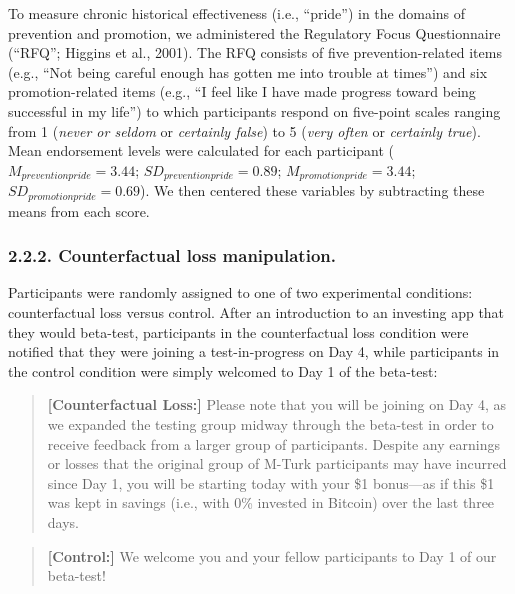 \documentclass[man,floatsintext]{apa6}
\begin{document}
To measure chronic historical effectiveness (i.e., \enquote{pride}) in the domains of prevention and promotion, we administered the Regulatory Focus Questionnaire (``RFQ''; Higgins et al., 2001). The RFQ consists of five prevention-related items (e.g., \enquote{Not being careful enough has gotten me into trouble at times}) and six promotion-related items (e.g., \enquote{I feel like I have made progress toward being successful in my life}) to which participants respond on five-point scales ranging from 1 (\emph{never or seldom} or \emph{certainly false}) to 5 (\emph{very often} or \emph{certainly true}). Mean endorsement levels were calculated for each participant (\(M_{prevention pride} = 3.44\); \(SD_{prevention pride} = 0.89\); \(M_{promotion pride} = 3.44\); \(SD_{promotion pride} = 0.69\)). We then centered these variables by subtracting these means from each score.

\hypertarget{counterfactual-loss-manipulation.}{%
\subsubsection{2.2.2. Counterfactual loss manipulation.}\label{counterfactual-loss-manipulation.}}

Participants were randomly assigned to one of two experimental conditions: counterfactual loss versus control. After an introduction to an investing app that they would beta-test, participants in the counterfactual loss condition were notified that they were joining a test-in-progress on Day 4, while participants in the control condition were simply welcomed to Day 1 of the beta-test:

\begin{quote}
\textbf{{[}Counterfactual Loss:{]}} Please note that you will be joining on Day 4, as we expanded the testing group midway through the beta-test in order to receive feedback from a larger group of participants. Despite any earnings or losses that the original group of M-Turk participants may have incurred since Day 1, you will be starting today with your \$1 bonus---as if this \$1 was kept in savings (i.e., with 0\% invested in Bitcoin) over the last three days.
\end{quote}

\begin{quote}
\textbf{{[}Control:{]}} We welcome you and your fellow participants to Day 1 of our beta-test!
\end{quote}
\end{document}
